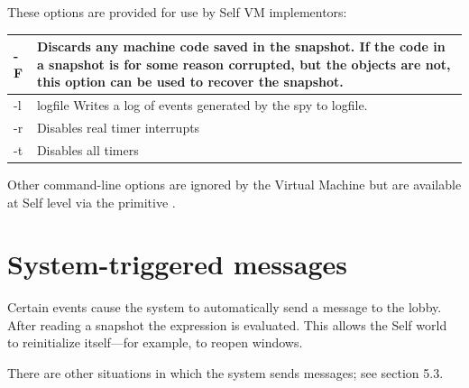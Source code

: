\documentclass[letterpaper,10pt,english]{sphinxmanual}
\begin{document}
These options are provided for use by Self VM implementors:

\begin{tabulary}{\linewidth}{|L|L|}
\hline

-F
 & 
Discards any machine code saved in the snapshot. If the code in a snapshot is for some reason corrupted, but the objects are not, this option can be used to recover the snapshot.
\\\hline

-l
 & 
logfile Writes a log of events generated by the spy to logfile.
\\\hline

-r
 & 
Disables real timer interrupts
\\\hline

-t
 & 
Disables all timers
\\\hline
\end{tabulary}


Other command-line options are ignored by the Virtual Machine but are available at Self level via
the primitive .


\section{System-triggered messages}
\label{vmref:system-triggered-messages}
Certain events cause the system to automatically send a message to the lobby. After reading a snapshot
the expression  is evaluated. This allows the Self world to
reinitialize itself—for example, to reopen windows.

There are other situations in which the system sends messages; see section 5.3.

\end{document}
